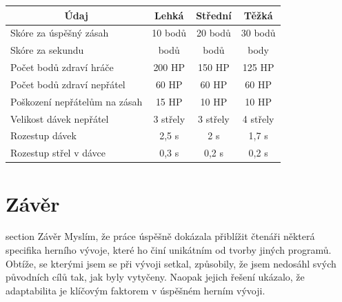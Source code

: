 \documentclass[12pt,a4paper,hidelinks]{article}
\begin{document}
\begin{table}[h!]
\centering
\begin{tabular}{@{}l|ccc@{}}
\toprule
\multicolumn{1}{c|}{\textbf{Údaj}} & \textbf{Lehká} & \textbf{Střední} & \textbf{Těžká} \\ \midrule
Skóre za úspěšný zásah             & 10 bodů        & 20 bodů          & 30 bodů        \\
Skóre za sekundu                   & \textminus5 bodů        & \textminus3 bodů          & \textminus2 body        \\
Počet bodů zdraví hráče            & 200 HP         & 150 HP           & 125 HP         \\
Počet bodů zdraví nepřátel         & 60 HP          & 60 HP            & 60 HP          \\
Poškození nepřátelům na zásah      & 15 HP          & 10 HP            & 10 HP          \\
Velikost dávek nepřátel            & 3 střely       & 3 střely         & 4 střely       \\
Rozestup dávek                     & 2,5 s          & 2 s              & 1,7 s          \\
Rozestup střel v dávce             & 0,3 s          & 0,2 s            & 0,2 s          \\ \bottomrule
\end{tabular}
\end{table}


\clearpage
\section*{Závěr}
 {section} {Závěr}
Myslím, že práce úspěšně dokázala přiblížit čtenáři některá specifika herního vývoje, které ho činí unikátním od tvorby jiných programů. Obtíže, se kterými jsem se při vývoji setkal, způsobily, že jsem nedosáhl svých původních cílů tak, jak byly vytyčeny. Naopak jejich řešení ukázalo, že adaptabilita je klíčovým faktorem v úspěšném herním vývoji.


\clearpage
\appendix
\end{document}
